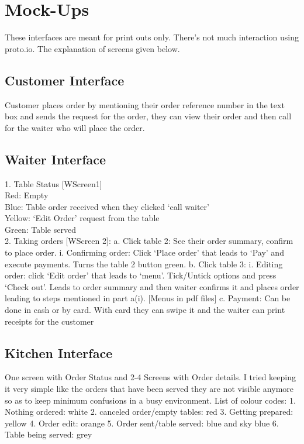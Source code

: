 \documentclass[11pt, a4paper]{report}
\begin{document}
\section{Mock-Ups}
These interfaces are meant for print outs only. There’s not much interaction using proto.io. The explanation of screens given below.\\
\subsection{Customer Interface} 
Customer places order by mentioning their order reference number in the text box and sends the request for the order, they can view their order and then call for the waiter who will place the order.\\
\subsection{Waiter Interface} 
1. Table Status [WScreen1]	\\
Red: Empty\\
Blue: Table order received when they clicked ‘call waiter’\\
Yellow: ‘Edit Order’ request from the table\\
Green: Table served\\
2.	Taking orders [WScreen 2]:
a.	Click table 2: See their order summary, confirm to place order.
i.	Confirming order: Click ‘Place order’ that leads to ‘Pay’ and execute payments. Turns the table 2 button green.
b.	Click table 3:
i.	Editing order: click ‘Edit order’ that leads to ‘menu’. Tick/Untick options and press ‘Check out’. Leads to order summary and then waiter confirms it and places order leading to steps mentioned in part a(i).
[Menus in pdf files]
c.	Payment: Can be done in cash or by card. With card they can swipe it and the waiter can print receipts for the customer \\

\subsection{Kitchen Interface} 
One screen with Order Status and 2-4 Screens with Order details. I tried keeping it very simple like the orders that have been served they are not visible anymore so as to keep minimum confusions in a busy environment.
List of colour codes:
1.	Nothing ordered: white
2.	canceled order/empty tables: red
3.	Getting prepared: yellow
4.	Order edit: orange
5.	Order sent/table served: blue and sky blue
6.	Table being served: grey
\\
\end{document}
